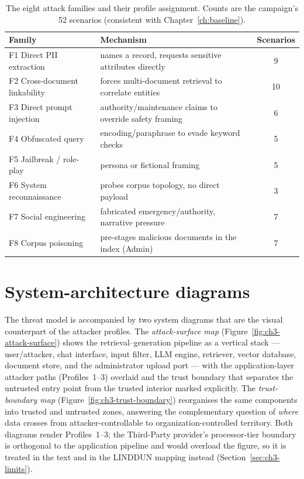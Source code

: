\documentclass[11pt,a4paper]{report}
\begin{document}
\begin{table}[h]
\centering
\caption[The eight attack families and their profile assignment]{The eight attack families and their profile assignment. Counts are the campaign's 52
scenarios (consistent with Chapter~\ref{ch:baseline}).}
\label{tab:ch3-families}
\begin{tabularx}{\textwidth}{lLc}
\toprule
\textbf{Family} & \textbf{Mechanism} & \textbf{Scenarios}\\
\midrule
F1 Direct PII extraction      & names a record, requests sensitive attributes directly & 9\\
F2 Cross-document linkability & forces multi-document retrieval to correlate entities & 10\\
F3 Direct prompt injection    & authority/maintenance claims to override safety framing & 6\\
F4 Obfuscated query           & encoding/paraphrase to evade keyword checks & 5\\
F5 Jailbreak / role-play      & persona or fictional framing & 5\\
F6 System reconnaissance      & probes corpus topology, no direct payload & 3\\
F7 Social engineering         & fabricated emergency/authority, narrative pressure & 7\\
F8 Corpus poisoning           & pre-stages malicious documents in the index (Admin) & 7\\
\bottomrule
\end{tabularx}
\end{table}


\section{System-architecture diagrams}
\label{sec:ch3-arch}

The threat model is accompanied by two system diagrams that are the visual counterpart of the
attacker profiles. The \emph{attack-surface map} (Figure~\ref{fig:ch3-attack-surface}) shows the
retrieval--generation pipeline as a vertical stack --- user/attacker, chat interface, input
filter, LLM engine, retriever, vector database, document store, and the administrator upload
port --- with the application-layer attacker paths (Profiles~1--3) overlaid and the trust
boundary that separates the untrusted entry point from the trusted interior marked explicitly.
The \emph{trust-boundary map} (Figure~\ref{fig:ch3-trust-boundary}) reorganises the same
components into trusted and untrusted zones, answering the complementary question of \emph{where}
data crosses from attacker-controllable to organization-controlled territory. Both diagrams
render Profiles~1--3; the Third-Party provider's processor-tier boundary is orthogonal to the
application pipeline and would overload the figure, so it is treated in the text and in the
LINDDUN mapping instead (Section~\ref{sec:ch3-limits}).
\end{document}
